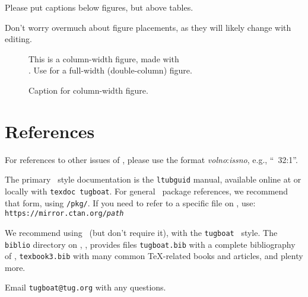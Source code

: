 \documentclass{ltugboat}
\begin{document}
Please put captions below figures, but above tables.

Don't worry overmuch about figure placements, as they will likely change
with editing.

\begin{figure}
This is a column-width figure, made with \\
. Use  for a full-width
(double-column) figure.
%
\caption{Caption for column-width figure.}
\label{fig.example}
\end{figure}


\section{References}

For references to other issues of \TUB, please use the format
\textsl{volno}:\textsl{issno}, e.g., ``\TUB\ 32:1''.

The primary \TUB\ style documentation is the \texttt{ltubguid} manual,
available online at  or locally with
\texttt{texdoc tugboat}. For general \CTAN\ package references, we
recommend that form, using \texttt{/pkg/}. If you need to refer to a
specific file on \CTAN, use:\\
\texttt{https://mirror.ctan.org/\textsl{path}}

We recommend using \BibTeX\ (but don't require it), with the
\texttt{tugboat} \BibTeX\ style. The \texttt{biblio} directory on \CTAN,
, provides files \texttt{tugboat.bib} with a
complete bibliography of \TUB, \texttt{texbook3.bib} with many common
\TeX-related books and articles, and plenty more.

Email \verb|tugboat@tug.org| with any questions.

\nocite{book-minimal}       %

\makesignature

\newpage
\end{document}
